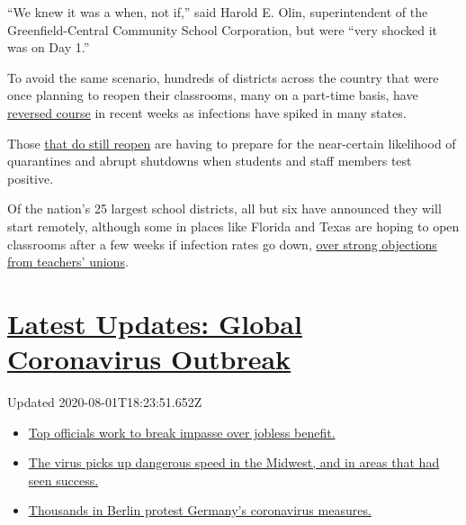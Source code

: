 ``We knew it was a when, not if,'' said Harold E. Olin, superintendent
of the Greenfield-Central Community School Corporation, but were ``very
shocked it was on Day 1.''

To avoid the same scenario, hundreds of districts across the country
that were once planning to reopen their classrooms, many on a part-time
basis, have
\href{https://www.nytimes.com/2020/07/13/us/lausd-san-diego-school-reopening.html}{reversed
course} in recent weeks as infections have spiked in many states.

Those
\href{https://www.nytimes.com/2020/07/14/us/coronavirus-schools-fall.html}{that
do still reopen} are having to prepare for the near-certain likelihood
of quarantines and abrupt shutdowns when students and staff members test
positive.

Of the nation's 25 largest school districts, all but six have announced
they will start remotely, although some in places like Florida and Texas
are hoping to open classrooms after a few weeks if infection rates go
down,
\href{https://www.nytimes.com/2020/07/29/us/teacher-union-school-reopening-coronavirus.html}{over
strong objections from teachers' unions}.

\hypertarget{latest-updates-global-coronavirus-outbreak}{%
\section{\texorpdfstring{\href{https://www.nytimes.com/2020/08/01/world/coronavirus-covid-19.html?action=click\&pgtype=Article\&state=default\&region=MAIN_CONTENT_1\&context=storylines_live_updates}{Latest
Updates: Global Coronavirus
Outbreak}}{Latest Updates: Global Coronavirus Outbreak}}\label{latest-updates-global-coronavirus-outbreak}}

Updated 2020-08-01T18:23:51.652Z

\begin{itemize}
\tightlist
\item
  \href{https://www.nytimes.com/2020/08/01/world/coronavirus-covid-19.html?action=click\&pgtype=Article\&state=default\&region=MAIN_CONTENT_1\&context=storylines_live_updates\#link-3ac56579}{Top
  officials work to break impasse over jobless benefit.}
\item
  \href{https://www.nytimes.com/2020/08/01/world/coronavirus-covid-19.html?action=click\&pgtype=Article\&state=default\&region=MAIN_CONTENT_1\&context=storylines_live_updates\#link-8796723}{The
  virus picks up dangerous speed in the Midwest, and in areas that had
  seen success.}
\item
  \href{https://www.nytimes.com/2020/08/01/world/coronavirus-covid-19.html?action=click\&pgtype=Article\&state=default\&region=MAIN_CONTENT_1\&context=storylines_live_updates\#link-25930521}{Thousands
  in Berlin protest Germany's coronavirus measures.}
\end{itemize}


